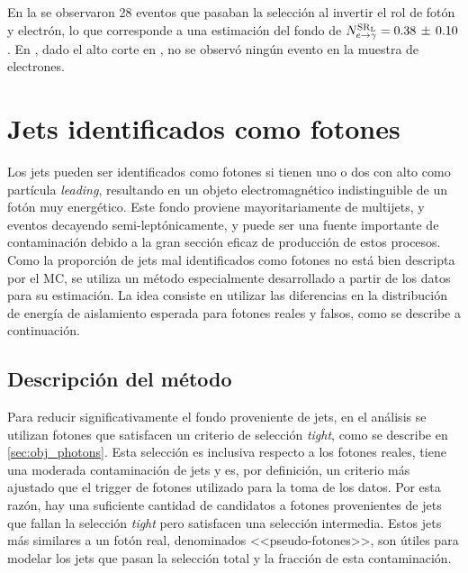 En la {\SRL} se observaron 28 eventos que pasaban la selección al invertir el
rol de fotón y electrón, lo que corresponde a una estimación del fondo de
$N^{\mathrm{SR}_\mathrm{L}}_{e\rightarrow\gamma} = 0.38\, \pm\, 0.10$. En {\SRH}, dado el alto corte en
{\met}, no se observó ningún evento en la muestra de electrones.



\section{Jets identificados como fotones}
\label{sec:jfakes}

Los jets pueden ser identificados como fotones si tienen uno o dos {\pizero} con
alto {\pt} como partícula \emph{leading}, resultando en un objeto
electromagnético indistinguible de un fotón muy energético. Este fondo
proviene mayoritariamente de multijets, {\wjets} y eventos {\ttbar} decayendo
semi-leptónicamente, y puede ser una fuente importante de contaminación debido a
la gran sección eficaz de producción de estos procesos. Como la proporción de
jets mal identificados como fotones no está bien descripta por el MC, se
utiliza un método especialmente desarrollado a partir de los datos para su estimación.
La idea consiste en utilizar las diferencias en la distribución de energía de aislamiento
esperada para fotones reales y falsos, como se describe a continuación.

\subsection{Descripción del método}

Para reducir significativamente el fondo proveniente de jets, en el análisis se
utilizan fotones que satisfacen un criterio de selección \emph{tight}, como se
describe en \cref{sec:obj_photons}. Esta selección es inclusiva respecto a los
fotones reales, tiene una moderada contaminación de jets y es, por definición,
un criterio más ajustado que el trigger de fotones utilizado para la toma de los
datos. Por esta razón, hay una suficiente cantidad de candidatos a fotones
provenientes de jets que fallan la selección \emph{tight} pero satisfacen una
selección intermedia. Estos jets más similares a un fotón real, denominados
<<pseudo-fotones>>, son útiles para modelar los jets que pasan la selección
total y la fracción de esta contaminación.



